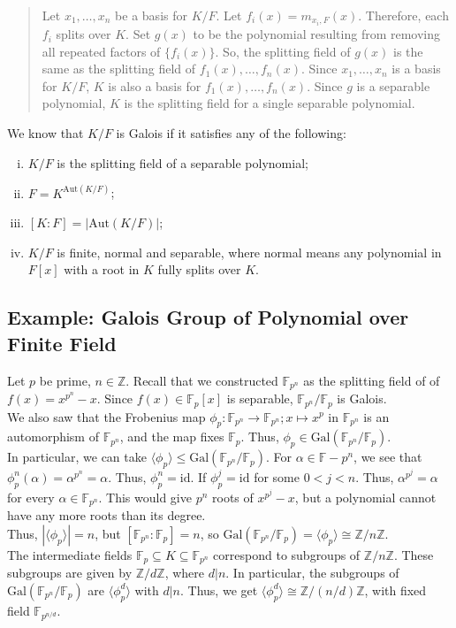 \documentclass[10pt]{extarticle}
\newcommand{\Z}{\mathbb{Z}}
\begin{document}
\begin{quote}
    Let $x_1,\dots,x_n$ be a basis for $K/F$. Let $f_i(x) = m_{x_i,F}(x)$. Therefore, each $f_i$ splits over $K$. Set $g(x)$ to be the polynomial resulting from removing all repeated factors of $\{f_i(x)\}$. So, the splitting field of $g(x)$ is the same as the splitting field of $f_1(x),\dots,f_n(x)$. Since $x_1,\dots,x_n$ is a basis for $K/F$, $K$ is also a basis for $f_1(x),\dots,f_n(x)$. Since $g$ is a separable polynomial, $K$ is the splitting field for a single separable polynomial.
  \end{quote}
  We know that $K/F$ is Galois if it satisfies any of the following:
  \begin{enumerate}[(i)]
    \item $K/F$ is the splitting field of a separable polynomial;
    \item $F = K^{\text{Aut}(K/F)}$;
    \item $[K:F] = |\text{Aut}(K/F)|$;
    \item $K/F$ is finite, normal and separable, where normal means any polynomial in $F[x]$ with a root in $K$ fully splits over $K$.
  \end{enumerate}
  \subsection{Example: Galois Group of Polynomial over Finite Field}%
  Let $p$ be prime, $n\in \Z$. Recall that we constructed $\mathbb{F}_{p^n}$ as the splitting field of of $f(x) = x^{p^n} - x$. Since $f(x) \in \mathbb{F}_{p}[x]$ is separable, $\mathbb{F}_{p^n}/\mathbb{F}_p$ is Galois.\\

  We also saw that the Frobenius map $\phi_p: \mathbb{F}_{p^n}\rightarrow \mathbb{F}_{p^n};x\mapsto x^{p}$ in $\mathbb{F}_{p^n}$ is an automorphism of $\mathbb{F}_{p^n}$, and the map fixes $\mathbb{F}_p$. Thus, $\phi_p\in \text{Gal}(\mathbb{F}_{p^n}/\mathbb{F}_p)$.\\

  In particular, we can take $\langle \phi_p\rangle\leq \text{Gal}(\mathbb{F}_{p^n}/\mathbb{F}_p)$. For $\alpha \in \mathbb{F}-{p^n}$, we see that $\phi_p^{n}(\alpha) = \alpha^{p^n} = \alpha$. Thus, $\phi_p^{n} = \text{id}$. If $\phi_p^{j} = \text{id}$ for some $0 < j < n$. Thus, $\alpha^{p^j} = \alpha$ for every $\alpha\in \mathbb{F}_{p^n}$. This would give $p^n$ roots of $x^{p^j}-x$, but a polynomial cannot have any more roots than its degree.\\

  Thus, $|\langle \phi_p\rangle| = n$, but $[\mathbb{F}_{p^n}:\mathbb{F}_p] = n$, so $\text{Gal}(\mathbb{F}_{p^n}/\mathbb{F}_p) = \langle \phi_p\rangle \cong \Z/n\Z$.\\

  The intermediate fields $\mathbb{F}_{p} \subseteq K\subseteq \mathbb{F}_{p^n}$ correspond to subgroups of $\Z/n\Z$. These subgroups are given by $\Z/d\Z$, where $d|n$. In particular, the subgroups of $\text{Gal}(\mathbb{F}_{p^n}/\mathbb{F}_p)$ are $\langle \phi_p^{d}\rangle$ with $d|n$. Thus, we get $\langle \phi_{p}^d\rangle \cong \Z/(n/d)\Z$, with fixed field $\mathbb{F}_{p^{n/d}}$.
\end{document}
